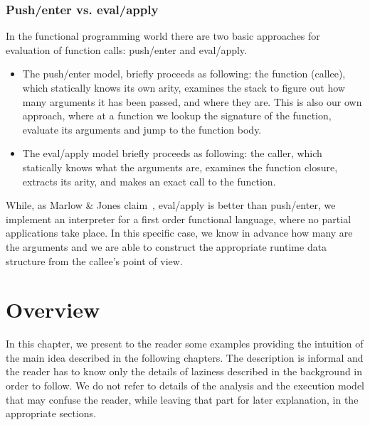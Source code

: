 \documentclass[diploma]{softlab-thesis}
\begin{document}
\subsection{Push/enter vs. eval/apply}
\label{sec:push-enter}

In the functional programming world there are two basic approaches for evaluation of function calls:
push/enter and eval/apply. 
\begin{itemize}
\item The push/enter model, briefly proceeds as following: 
the function (callee), which statically knows its own arity, 
examines the stack to figure out how many arguments it has been passed, and where they are. This 
is also our own approach, where at a function we lookup the signature of the function, evaluate 
its arguments and jump to the function body.
\item The eval/apply model briefly proceeds as following: the caller, which statically knows 
what the arguments are, examines the function closure, extracts its arity, and makes an exact 
call to the function.
\end{itemize}

While, as Marlow \& Jones claim~\cite{Ma06}, eval/apply is better than push/enter, we implement an 
interpreter for a first order functional language, where no partial applications take place.
In this specific case, we know in advance how many are the arguments and we are able to construct 
the appropriate runtime data structure from the callee's point of view.






\chapter {Overview}
\label{ch:overview}

In this chapter, we present to the reader some examples providing the intuition of the main idea described 
in the following chapters. The description is informal and the reader has to know only the details of laziness 
described in the background in order to follow. We do not refer to details of the analysis and the execution model 
that may confuse the reader, while leaving that part for later explanation, in the appropriate sections.
\end{document}
